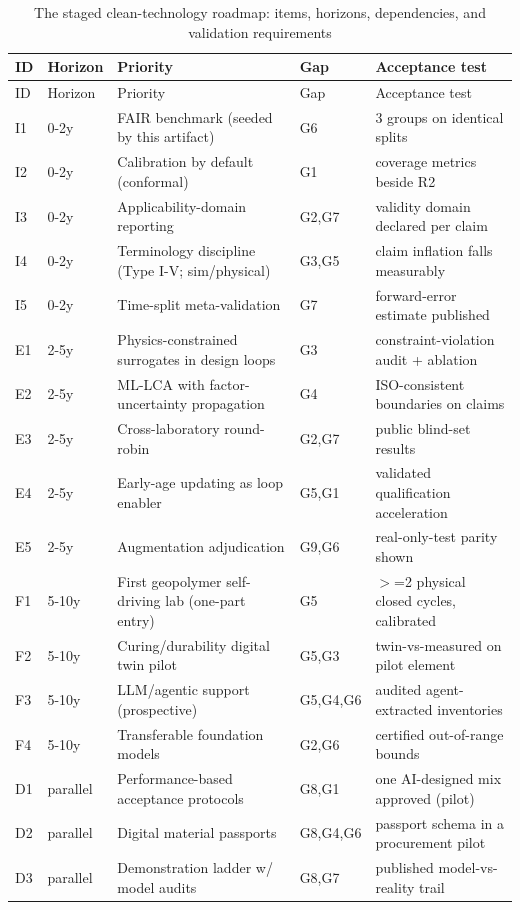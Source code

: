 \documentclass[pdflatex,sn-basic]{sn-jnl}
\begin{document}
{\footnotesize
\begin{longtable}{llp{}lp{}}
\caption{The staged clean-technology roadmap: items, horizons, dependencies, and validation requirements}\\
\toprule
ID & Horizon & Priority & Gap & Acceptance test \\
\midrule
\endfirsthead
\toprule
ID & Horizon & Priority & Gap & Acceptance test \\
\midrule
\endhead
\bottomrule
\endfoot
I1 & 0-2y & FAIR benchmark (seeded by this artifact) & G6 & 3 groups on identical splits \\
I2 & 0-2y & Calibration by default (conformal) & G1 & coverage metrics beside R2 \\
I3 & 0-2y & Applicability-domain reporting & G2,G7 & validity domain declared per claim \\
I4 & 0-2y & Terminology discipline (Type I-V; sim/physical) & G3,G5 & claim inflation falls measurably \\
I5 & 0-2y & Time-split meta-validation & G7 & forward-error estimate published \\
E1 & 2-5y & Physics-constrained surrogates in design loops & G3 & constraint-violation audit + ablation \\
E2 & 2-5y & ML-LCA with factor-uncertainty propagation & G4 & ISO-consistent boundaries on claims \\
E3 & 2-5y & Cross-laboratory round-robin & G2,G7 & public blind-set results \\
E4 & 2-5y & Early-age updating as loop enabler & G5,G1 & validated qualification acceleration \\
E5 & 2-5y & Augmentation adjudication & G9,G6 & real-only-test parity shown \\
F1 & 5-10y & First geopolymer self-driving lab (one-part entry) & G5 & $>$=2 physical closed cycles, calibrated \\
F2 & 5-10y & Curing/durability digital twin pilot & G5,G3 & twin-vs-measured on pilot element \\
F3 & 5-10y & LLM/agentic support (prospective) & G5,G4,G6 & audited agent-extracted inventories \\
F4 & 5-10y & Transferable foundation models & G2,G6 & certified out-of-range bounds \\
D1 & parallel & Performance-based acceptance protocols & G8,G1 & one AI-designed mix approved (pilot) \\
D2 & parallel & Digital material passports & G8,G4,G6 & passport schema in a procurement pilot \\
D3 & parallel & Demonstration ladder w/ model audits & G8,G7 & published model-vs-reality trail \\
\end{longtable}}
\end{document}
